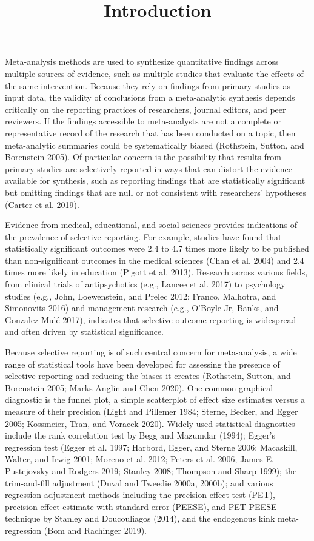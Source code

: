 \documentclass[
]{article}
\title{Introduction}
\author{}
\date{\vspace{-2.5em}}
\begin{document}
\maketitle

Meta-analysis methods are used to synthesize quantitative findings
across multiple sources of evidence, such as multiple studies that
evaluate the effects of the same intervention. Because they rely on
findings from primary studies as input data, the validity of conclusions
from a meta-analytic synthesis depends critically on the reporting
practices of researchers, journal editors, and peer reviewers. If the
findings accessible to meta-analysts are not a complete or
representative record of the research that has been conducted on a
topic, then meta-analytic summaries could be systematically biased
(Rothstein, Sutton, and Borenstein 2005). Of particular concern is the
possibility that results from primary studies are selectively reported
in ways that can distort the evidence available for synthesis, such as
reporting findings that are statistically significant but omitting
findings that are null or not consistent with researchers' hypotheses
(Carter et al. 2019).

Evidence from medical, educational, and social sciences provides
indications of the prevalence of selective reporting. For example,
studies have found that statistically significant outcomes were 2.4 to
4.7 times more likely to be published than non-significant outcomes in
the medical sciences (Chan et al. 2004) and 2.4 times more likely in
education (Pigott et al. 2013). Research across various fields, from
clinical trials of antipsychotics (e.g., Lancee et al. 2017) to
psychology studies (e.g., John, Loewenstein, and Prelec 2012; Franco,
Malhotra, and Simonovits 2016) and management research (e.g., O'Boyle
Jr, Banks, and Gonzalez-Mulé 2017), indicates that selective outcome
reporting is widespread and often driven by statistical significance.

Because selective reporting is of such central concern for
meta-analysis, a wide range of statistical tools have been developed for
assessing the presence of selective reporting and reducing the biases it
creates (Rothstein, Sutton, and Borenstein 2005; Marks‐Anglin and Chen
2020). One common graphical diagnostic is the funnel plot, a simple
scatterplot of effect size estimates versus a measure of their precision
(Light and Pillemer 1984; Sterne, Becker, and Egger 2005; Kossmeier,
Tran, and Voracek 2020). Widely used statistical diagnostics include the
rank correlation test by Begg and Mazumdar (1994); Egger's regression
test (Egger et al. 1997; Harbord, Egger, and Sterne 2006; Macaskill,
Walter, and Irwig 2001; Moreno et al. 2012; Peters et al. 2006; James E.
Pustejovsky and Rodgers 2019; Stanley 2008; Thompson and Sharp 1999);
the trim-and-fill adjustment (Duval and Tweedie 2000a, 2000b); and
various regression adjustment methods including the precision effect
test (PET), precision effect estimate with standard error (PEESE), and
PET-PEESE technique by Stanley and Doucouliagos (2014), and the
endogenous kink meta-regression (Bom and Rachinger 2019).
\end{document}
